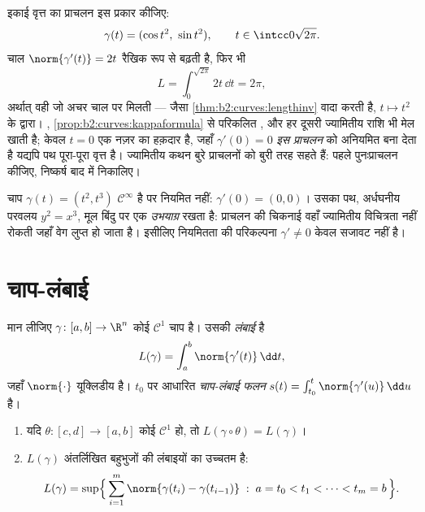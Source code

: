 \begin{example}[चाल ज्यामितीय रूप से कुछ नहीं
बदलती]\label{ex:b2:curves:speedinvariance}
इकाई वृत्त का प्राचलन इस प्रकार कीजिए:
\[
\gamma(t) = (\cos t^2,\ \sin t^2),
\qquad t \in \intcc0{\sqrt{2\pi}} .
\]
चाल $\norm{\gamma'(t)} = 2t$ रैखिक रूप से बढ़ती है, फिर भी
\[
L = \int_0^{\sqrt{2\pi}}2t\,\dd t = 2\pi ,
\]
अर्थात् वही  जो अचर चाल पर मिलती --- जैसा \cref{thm:b2:curves:lengthinv} वादा करती है,
 $t \mapsto t^2$ के द्वारा। , \cref{prop:b2:curves:kappaformula} से परिकलित
, और हर दूसरी ज्यामितीय राशि भी मेल खाती है; केवल $t = 0$
एक नज़र का हक़दार है, जहाँ $\gamma'(0) = 0$ \emph{इस प्राचलन} को अनियमित बना
देता है यद्यपि पथ पूरा-पूरा वृत्त है। ज्यामितीय कथन बुरे प्राचलनों को
बुरी तरह सहते हैं: पहले पुनःप्राचलन कीजिए, निष्कर्ष बाद में
निकालिए।
\end{example}

\begin{example}\label{ex:b2:curves:cusp}
चाप $\gamma(t) = (t^2, t^3)$ $\mathcal{C}^\infty$ है पर नियमित नहीं: $\gamma'(0) = (0, 0)$। उसका पथ,
अर्धघनीय परवलय $y^2 = x^3$, मूल बिंदु पर एक \emph{उभयाग्र} रखता है:
प्राचलन की चिकनाई वहाँ ज्यामितीय विचित्रता नहीं रोकती जहाँ वेग लुप्त हो
जाता है। इसीलिए नियमितता की परिकल्पना $\gamma' \neq 0$ केवल सजावट नहीं है।
\end{example}

\section{चाप-लंबाई}

\begin{definition}[चाप-लंबाई]\label{def:b2:curves:length}
मान लीजिए $\gamma \colon [a, b] \to \R^n$ कोई $\mathcal{C}^1$ चाप है। उसकी
\emph{लंबाई} है
\[
L(\gamma) = \int_a^b \norm{\gamma'(t)}\, \dd t ,
\]
जहाँ $\norm{\cdot}$ यूक्लिडीय  है। $t_0$ पर आधारित \emph{चाप-लंबाई
फलन} $s(t) = \int_{t_0}^t
\norm{\gamma'(u)}\,\dd u$ है।
\end{definition}

\begin{theorem}[लंबाई ज्यामितीय है; बहुभुजीय
अभिलक्षणन]\label{thm:b2:curves:lengthinv}
\leavevmode
\begin{enumerate}
\item यदि $\theta \colon [c, d] \to [a, b]$ कोई $\mathcal{C}^1$
 हो, तो $L(\gamma \circ \theta) = L(\gamma)$।
\item $L(\gamma)$ अंतर्लिखित बहुभुजों की लंबाइयों का उच्चतम है:
\[
L(\gamma)
= \sup\Bigl\{\, \sum_{i=1}^{m} \norm{\gamma(t_i) -
\gamma(t_{i-1})} \;:\; a = t_0 < t_1 < \dots < t_m = b \,\Bigr\}.
\]
\end{enumerate}
\end{theorem}

